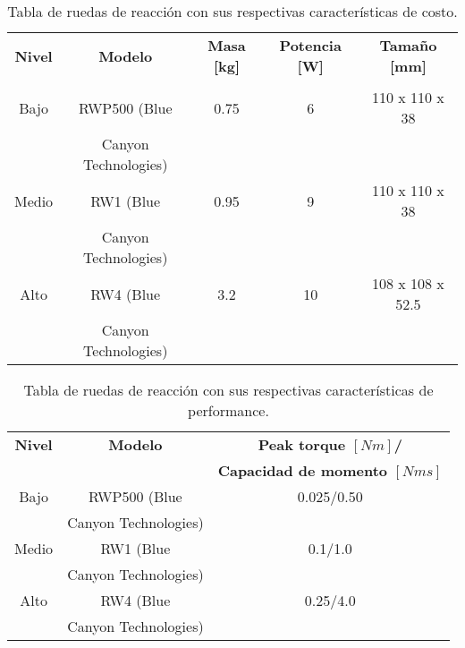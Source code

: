 \begin{table}[H]
	\centering
	\caption{Tabla de ruedas de reacción con sus respectivas características de costo.}
	\begin{tabular}{|c|c|c|c|c|}
		\hline
		\textbf{Nivel} & \textbf{Modelo} & \textbf{Masa [kg]} & \textbf{Potencia [W]} & \textbf{Tamaño [mm]}  \\
		& &  &  &   \\ \hline
		Bajo & RWP500 \cite{ref59} (Blue  & 0.75 & 6 & 110 x 110 x 38 \\
		&  Canyon Technologies) &  &  &  \\ \hline
		Medio & RW1 \cite{ref60} (Blue & 0.95 & 9 &  110 x 110 x 38   \\
		& Canyon Technologies) & &  &  \\ \hline
		Alto & RW4 \cite{ref61} (Blue & 3.2 & 10 & 108 x 108 x 52.5  \\
		& Canyon Technologies) & &  &   \\ \hline
	\end{tabular}
	
\end{table}

\begin{table}[H]
	\centering
	\caption{Tabla de ruedas de reacción con sus respectivas características de performance.}
	\begin{tabular}{|c|c|c|}
		\hline
		\textbf{Nivel} & \textbf{Modelo} & \textbf{Peak torque $[Nm]$/}  \\
		& & \textbf{Capacidad de momento $[Nms]$}   \\ \hline
		Bajo & RWP500 (Blue & 0.025/0.50  \\
		& Canyon Technologies) &   \\ \hline
		Medio & RW1 (Blue & 0.1/1.0  \\
		& Canyon Technologies) &   \\ \hline
		Alto & RW4 (Blue & 0.25/4.0   \\
		& Canyon Technologies) &    \\ \hline
	\end{tabular}
	
\end{table}
